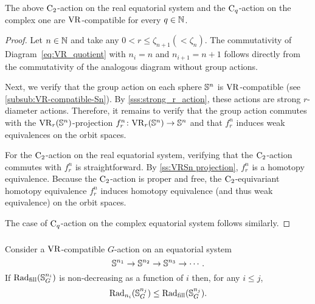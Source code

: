 \lemma The above \(\mathrm{C}_2\)-action on the real equatorial system and the \(\mathrm{C}_q\)-action on the complex one are \(\mathrm{VR}\)-compatible for every \(q \in \mathbb{N}\).

\begin{proof}
    Let $n \in \mathbb{N}$ and take any $0 < r \leq \zeta_{n+1} (< \zeta_{n})$.
    The commutativity of Diagram~\ref{eq:VR_quotient} with $n_i = n$ and $n_{i+1} = n+1$ follows directly from the commutativity of the analogous diagram without group actions.

    Next, we verify that the group action on each sphere $\mathbb{S}^n$ is \(\mathrm{VR}\)-compatible (see \cref{subsub:VR-compatible-Sn}).
    By \cref{sss:strong_r_action}, these actions are strong \(r\)-diameter actions. 
    Therefore, it remains to verify that the group action commutes with the $\mathrm{VR}_r(\mathbb{S}^{n})$-projection $f_r^{n}\colon \mathrm{VR}_r(\mathbb{S}^{n}) \to \mathbb{S}^{n}$ and that $f_r^{n}$ induces weak equivalences on the orbit spaces.

    For the $\mathrm{C}_2$-action on the real equatorial system, verifying that the $\mathrm{C}_2$-action commutes with $f_r^{n}$ is straightforward.
    By \cref{ss:VRSn projection}, $f_r^{n}$ is a homotopy equivalence.
    Because the $\mathrm{C}_2$-action is proper and free, the $\mathrm{C}_2$-equivariant homotopy equivalence $f_r^n$ induces homotopy equivalence (and thus weak equivalence) on the orbit spaces.

    The case of $\mathrm{C}_q$-action on the complex equatorial system follows similarly.
\end{proof}

\subsubsection{}\label{ss:fundamental_lemma}

\medskip\lemma Consider a $\mathrm{VR}$-compatible \(G\)-action on an equatorial system
\[
\mathbb{S}^{n_1} \to \mathbb{S}^{n_2} \to \mathbb{S}^{n_3} \to \dotsb.
\]
If $\mathrm{Rad}_{\mathrm{fill}}(\mathbb{S}^{n_i}_G)$ is non-decreasing as a function of \(i\) then, for any \(i \leq j\),
\[
\mathrm{Rad}_{n_i}(\mathbb{S}^{n_j}_G) \leq \mathrm{Rad}_{\mathrm{fill}}(\mathbb{S}^{n_j}_G).
\]

